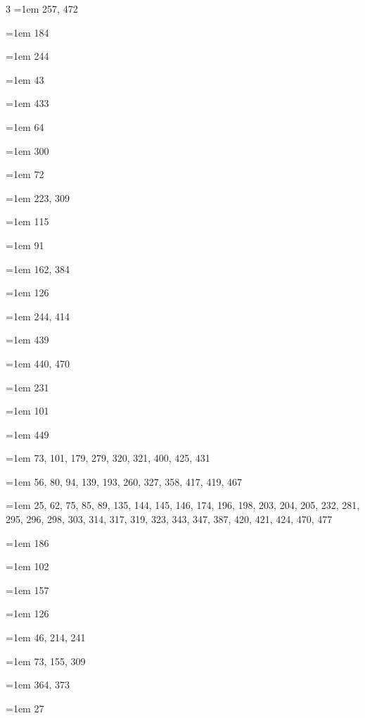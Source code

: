 \begin{multicols}{3}
\hangindent=1em  257, 472\par
\hangindent=1em  184\par
\hangindent=1em  244\par
\hangindent=1em  43\par
\hangindent=1em  433\par
\hangindent=1em  64\par
\hangindent=1em  300\par
\hangindent=1em  72\par
\hangindent=1em  223, 309\par
\hangindent=1em  115\par
\hangindent=1em  91\par
\hangindent=1em  162, 384\par
\hangindent=1em  126\par
\hangindent=1em  244, 414\par
\hangindent=1em  439\par
\hangindent=1em  440, 470\par
\hangindent=1em  231\par
\hangindent=1em  101\par
\hangindent=1em  449\par
\hangindent=1em  73, 101, 179, 279, 320, 321, 400, 425, 431\par
\hangindent=1em  56, 80, 94, 139, 193, 260, 327, 358, 417, 419, 467\par
\hangindent=1em  25, 62, 75, 85, 89, 135, 144, 145, 146, 174, 196, 198, 203, 204, 205, 232, 281, 295, 296, 298, 303, 314, 317, 319, 323, 343, 347, 387, 420, 421, 424, 470, 477\par
\hangindent=1em  186\par
\hangindent=1em  102\par
\hangindent=1em  157\par
\hangindent=1em  126\par
\hangindent=1em  46, 214, 241\par
\hangindent=1em  73, 155, 309\par
\hangindent=1em  364, 373\par
\hangindent=1em  27\par

\end{multicols}
